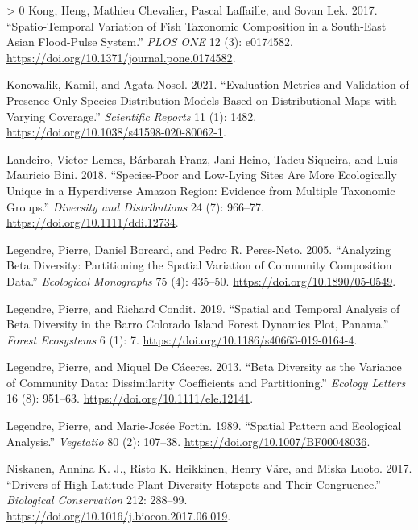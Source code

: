 \documentclass[10pt,oneside]{article}
\newlength{\cslhangindent}
\newenvironment{CSLReferences}[3] %
 {%
  \setlength{\parindent}{0pt}
  \ifodd #1 \everypar{\setlength{\hangindent}{\cslhangindent}}\ignorespaces\fi
  \ifnum #2 > 0
  \setlength{\parskip}{#2\baselineskip}
  \fi
 }%
 {}
\begin{document}
\begin{CSLReferences}{1}{0}
\leavevmode\hypertarget{ref-Kong2017SpaVar}{}%
Kong, Heng, Mathieu Chevalier, Pascal Laffaille, and Sovan Lek. 2017.
{``Spatio-Temporal Variation of Fish Taxonomic Composition in a
South-East Asian Flood-Pulse System.''} \emph{PLOS ONE} 12 (3):
e0174582. \url{https://doi.org/10.1371/journal.pone.0174582}.

\leavevmode\hypertarget{ref-Konowalik2021EvaMet}{}%
Konowalik, Kamil, and Agata Nosol. 2021. {``Evaluation Metrics and
Validation of Presence-Only Species Distribution Models Based on
Distributional Maps with Varying Coverage.''} \emph{Scientific Reports}
11 (1): 1482. \url{https://doi.org/10.1038/s41598-020-80062-1}.

\leavevmode\hypertarget{ref-Landeiro2018SpeLow}{}%
Landeiro, Victor Lemes, Bárbarah Franz, Jani Heino, Tadeu Siqueira, and
Luis Mauricio Bini. 2018. {``Species-Poor and Low-Lying Sites Are More
Ecologically Unique in a Hyperdiverse Amazon Region: Evidence from
Multiple Taxonomic Groups.''} \emph{Diversity and Distributions} 24 (7):
966--77. \url{https://doi.org/10.1111/ddi.12734}.

\leavevmode\hypertarget{ref-Legendre2005AnaBet}{}%
Legendre, Pierre, Daniel Borcard, and Pedro R. Peres-Neto. 2005.
{``Analyzing Beta Diversity: Partitioning the Spatial Variation of
Community Composition Data.''} \emph{Ecological Monographs} 75 (4):
435--50. \url{https://doi.org/10.1890/05-0549}.

\leavevmode\hypertarget{ref-Legendre2019SpaTem}{}%
Legendre, Pierre, and Richard Condit. 2019. {``Spatial and Temporal
Analysis of Beta Diversity in the Barro Colorado Island Forest Dynamics
Plot, Panama.''} \emph{Forest Ecosystems} 6 (1): 7.
\url{https://doi.org/10.1186/s40663-019-0164-4}.

\leavevmode\hypertarget{ref-Legendre2013BetDiv}{}%
Legendre, Pierre, and Miquel De Cáceres. 2013. {``Beta Diversity as the
Variance of Community Data: Dissimilarity Coefficients and
Partitioning.''} \emph{Ecology Letters} 16 (8): 951--63.
\url{https://doi.org/10.1111/ele.12141}.

\leavevmode\hypertarget{ref-Legendre1989SpaPat}{}%
Legendre, Pierre, and Marie-Josée Fortin. 1989. {``Spatial Pattern and
Ecological Analysis.''} \emph{Vegetatio} 80 (2): 107--38.
\url{https://doi.org/10.1007/BF00048036}.

\leavevmode\hypertarget{ref-Niskanen2017DriHig}{}%
Niskanen, Annina K. J., Risto K. Heikkinen, Henry Väre, and Miska Luoto.
2017. {``Drivers of High-Latitude Plant Diversity Hotspots and Their
Congruence.''} \emph{Biological Conservation} 212: 288--99.
\url{https://doi.org/10.1016/j.biocon.2017.06.019}.


\end{CSLReferences}
\end{document}
